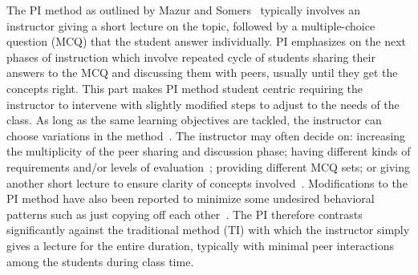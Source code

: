 \documentclass[twocolumn,secnumarabic,amssymb, nobibnotes, aps, prd]{revtex4-2}
\begin{document}

    
    The PI method as outlined by Mazur and Somers~\cite{mazur1997peer} typically involves an instructor giving a short lecture on the topic, followed by a multiple-choice question (MCQ) that the student answer individually.
    PI emphasizes on the next phases of instruction which involve repeated cycle of students sharing their answers to the MCQ and discussing them with peers, usually until they get the concepts right.
    This part makes PI method student centric requiring the instructor to intervene with slightly modified steps to adjust to the needs of the class.
    As long as the same learning objectives are tackled, the instructor can choose variations in the method~\cite{smith2009peer}.
    The instructor may often decide on: increasing the multiplicity of the peer sharing and discussion phase; having different kinds of requirements and/or levels of evaluation~\cite{crouch2001peer}; providing different MCQ sets; or giving another short lecture to ensure clarity of concepts involved~\cite{lasry2008peer}.
    Modifications to the PI method have also been reported to minimize some undesired behavioral patterns such as just copying off each other~\cite{smith2009peer}.
    The PI therefore contrasts significantly against the traditional method (TI) with which the instructor simply gives a lecture for the entire duration, typically with minimal peer interactions among the students during class time.
    
\end{document}
